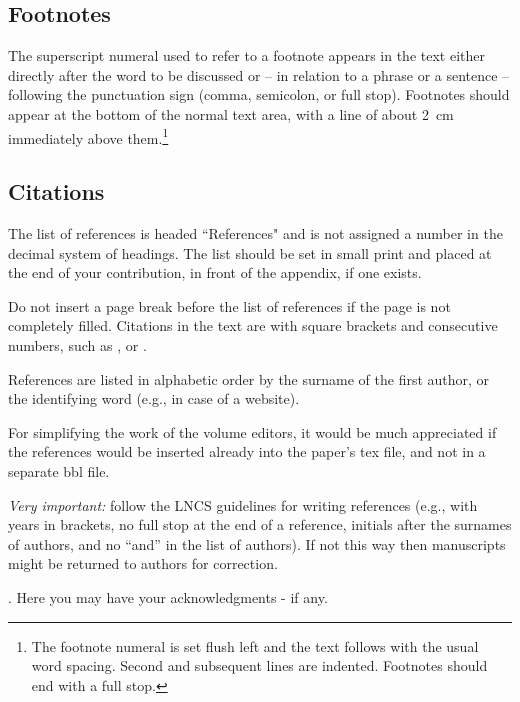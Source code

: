 \documentclass[runningheads]{llncs}
\begin{document}
\subsection{Footnotes}

The superscript numeral used to refer to a footnote appears in the text
either directly after the word to be discussed or -- in relation to a
phrase or a sentence -- following the punctuation sign (comma,
semicolon, or full stop). Footnotes should appear at the bottom of
the
normal text area, with a line of about 2~cm 
immediately above them.\footnote
{
   The footnote numeral is set flush left
   and the text follows with the usual word spacing. Second and subsequent
   lines are indented. Footnotes should end with a full stop.
}

\subsection{Citations}

The list of references is headed ``References" and is not assigned a
number
in the decimal system of headings. The list should be set in small print
and placed at the end of your contribution, in front of the appendix,
if one exists.

Do not insert a page break before the list of references if the
page is not completely filled.
Citations in the text are with
square brackets and consecutive numbers, such as \cite{Alpher02}, or
\cite{Alpher03,Herman04,Wills99}.

References are listed in alphabetic order by the surname of the first author, or the
identifying word (e.g., in case of a website). 

For simplifying the work of the volume editors, it would be much appreciated
if the references would be inserted already into the paper's tex file, and not
in a separate bbl file.

{\it Very important:} follow the LNCS guidelines for writing references (e.g., with years
in brackets, no full stop at the end of a reference, initials after the surnames of
authors, and no ``and'' in the list of authors). If not this way then manuscripts might be returned 
to authors for correction.

\vspace{3mm}
. Here you may have your acknowledgments - if any.
\end{document}
